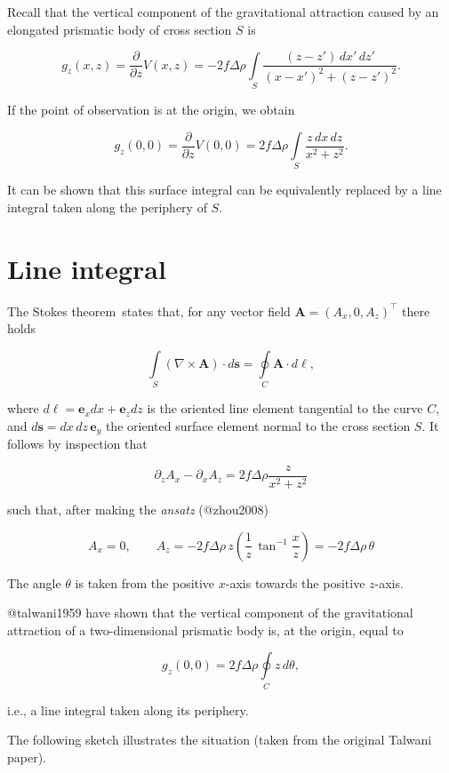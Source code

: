 \documentclass[
  a4paper,
  DIV=11,
  numbers=noendperiod]{scrreprt}
\begin{document}
Recall that the vertical component of the gravitational attraction
caused by an elongated prismatic body of cross section \(S\) is

\[
g_z(x,z) = \frac{\partial}{\partial z}V(x,z) = -2 f \Delta \rho \int\limits_S \frac{(z - z')\, dx' \,dz'}{(x-x')^2 + (z-z')^2}.
\]

If the point of observation is at the origin, we obtain

\[
g_z(0,0) = \frac{\partial}{\partial z}V(0,0) = 2 f \Delta \rho \int\limits_S \frac{z\, dx \, dz}{x^2 + z^2}.
\]

It can be shown that this surface integral can be equivalently replaced
by a line integral taken along the periphery of \(S\).

\section{Line integral}\label{line-integral}

The Stokes theorem~states that, for any vector field
\(\mathbf A = (A_x, 0, A_z)^\top\) there holds

\[
\int\limits_S (\nabla \times \mathbf A) \cdot d\mathbf s = \oint\limits_C \mathbf A \cdot d\mathbf \ell,
\]

where \(d\mathbf\ell = \mathbf e_x dx + \mathbf e_z dz\) is the oriented
line element tangential to the curve \(C\), and
\(d\mathbf s = dx \,dz \, \mathbf e_y\) the oriented surface element
normal to the cross section \(S\). It follows by inspection that

\[
\partial_z A_x - \partial_x A_z = 2 f \Delta \rho \frac{z}{x^2 + z^2}
\]

such that, after making the \emph{ansatz} (@zhou2008)

\[
A_x = 0, \qquad A_z = -2 f \Delta\rho \, z \left(\frac{1}{z} \, \tan^{-1}\frac{x}{z}\right) = -2 f \Delta \rho \, \theta
\]

The angle \(\theta\) is taken from the positive \(x\)-axis towards the
positive \(z\)-axis.

@talwani1959 have shown that the vertical component of the gravitational
attraction of a two-dimensional prismatic body is, at the origin, equal
to

\[
g_z(0, 0) = 2 f \Delta \rho \oint\limits_C z \, d\theta,
\]

i.e., a line integral taken along its periphery.

The following sketch illustrates the situation (taken from the original
Talwani paper).
\end{document}

